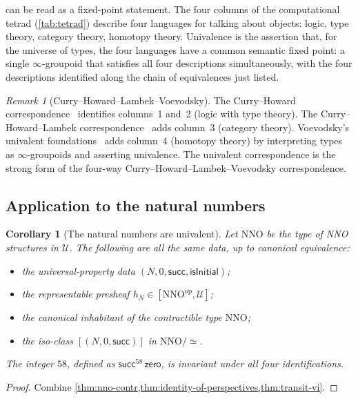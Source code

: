 \documentclass[12pt]{article}
\newtheorem{corollary}[theorem]{Corollary}
\theoremstyle{definition}
\theoremstyle{remark}
\newtheorem{remark}[theorem]{Remark}
\newcommand{\U}{\mathcal{U}}
\newcommand{\op}{^{\mathrm{op}}}
\newcommand{\zero}{\mathsf{zero}}
\newcommand{\suc}{\mathsf{succ}}
\newcommand{\eqv}{\simeq}
\newcommand{\NNO}{\mathrm{NNO}}
\begin{document}
 can be read as a fixed-point statement. The four
columns of the computational tetrad (\cref{tab:tetrad}) describe four
languages for talking about objects: logic, type theory, category
theory, homotopy theory. Univalence is the assertion that, for the
universe of types, the four languages have a common semantic
fixed point: a single $\infty$-groupoid that satisfies all four
descriptions simultaneously, with the four descriptions identified along
the chain of equivalences just listed.

\begin{remark}[Curry--Howard--Lambek--Voevodsky]
The Curry--Howard correspondence~\cite{Wadler2015} identifies columns~1
and~2 (logic with type theory). The Curry--Howard--Lambek
correspondence~\cite{Lambek1972,maclane} adds column~3 (category theory).
Voevodsky's univalent foundations~\cite{Voevodsky,HoTTBook} adds
column~4 (homotopy theory) by interpreting types as $\infty$-groupoids
and asserting univalence. The univalent correspondence is the strong
form of the four-way Curry--Howard--Lambek--Voevodsky correspondence.
\end{remark}

\subsection{Application to the natural numbers}

\begin{corollary}[The natural numbers are univalent]
\label{cor:N-univalent}
Let $\NNO$ be the type of NNO structures in $\U$. The following are all
the same data, up to canonical equivalence:
\begin{itemize}
\item the universal-property data $(N, 0, \suc, \mathsf{isInitial})$;
\item the representable presheaf $h_N \in [\NNO\op, \U]$;
\item the canonical inhabitant of the contractible type $\NNO$;
\item the iso-class $[(N, 0, \suc)]$ in $\NNO/\eqv$.
\end{itemize}
The integer $58$, defined as $\suc^{58}\,\zero$, is invariant under all
four identifications.
\end{corollary}

\begin{proof}
Combine \cref{thm:nno-contr,thm:identity-of-perspectives,thm:transit-vi}.
\end{proof}
\end{document}
